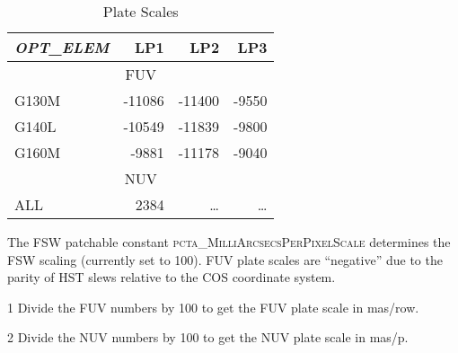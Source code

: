 \begin{table}
\footnotesize
\centering
	\begin{threeparttable}[tbc]
	\caption{ Plate Scales}
	\begin{tabular*}{.8\linewidth}{@{\extracolsep{\fill}}lrrr}
		\toprule
		\textit{OPT\_ELEM} &	LP1	&	LP2	&	LP3	\\
		\midrule
		\multicolumn{4}{c}{FUV\tnote{1}}\\
		\midrule
		G130M &  -11086 &  -11400 &   -9550 \\
		G140L &  -10549 &  -11839 &   -9800 \\
		G160M &   -9881 &  -11178 &   -9040 \\
		\midrule
		\multicolumn{4}{c}{NUV\tnote{2}}\\
		\midrule
			ALL	&	2384	&	\dots	&	\dots \\
		\bottomrule
	\end{tabular*}
	\scriptsize
		\begin{tablenotes}
			\item[] {The FSW patchable constant \textsc{pcta\_MilliArcsecsPerPixelScale} determines the FSW scaling (currently set to 100). FUV plate scales are ``negative'' due to the parity of HST slews relative to the COS coordinate system.\\}
			\item[1] {Divide the FUV numbers by 100 to get the FUV plate scale in mas/row.}
			\item[2] {Divide the NUV numbers by 100 to get the NUV plate scale in mas/p. }
		\end{tablenotes}
	\label{tab:FSWplatescales}
	\normalsize
	\end{threeparttable}
\normalsize
\end{table}
